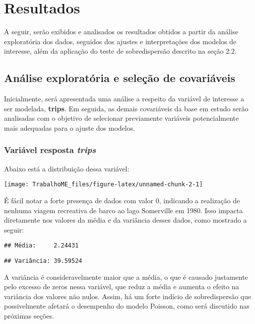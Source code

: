\documentclass[
  twocolumn]{article}
\begin{document}
\section{Resultados}\label{resultados}

A seguir, serão exibidos e analisados os resultados obtidos a partir da
análise exploratória dos dados, seguidos dos ajustes e interpretações
dos modelos de interesse, além da aplicação do teste de sobredispersão
descrito na seção 2.2.

\subsection{Análise exploratória e seleção de
covariáveis}\label{anuxe1lise-exploratuxf3ria-e-seleuxe7uxe3o-de-covariuxe1veis}

Inicialmente, será apresentada uma análise a respeito da variável de
interesse a ser modelada, \textbf{trips}. Em seguida, as demais
covariáveis da base em estudo serão analisadas com o objetivo de
selecionar previamente variáveis potencialmente mais adequadas para o
ajuste dos modelos.

\subsubsection{\texorpdfstring{Variável resposta
\emph{trips}}{Variável resposta trips}}\label{variuxe1vel-resposta-trips}

Abaixo está a distribuição dessa variável:

\begin{center}\texttt{[image: TrabalhoME\_files/figure-latex/unnamed-chunk-2-1]} \end{center}

É fácil notar a forte presença de dados com valor \(0\), indicando a
realização de nenhuma viagem recreativa de barco ao lago Somerville em
1980. Isso impacta diretamente nos valores da média e da variância
desses dados, como mostrado a seguir:

\begin{verbatim}
## Média:     2.24431
\end{verbatim}

\begin{verbatim}
## Variância: 39.59524
\end{verbatim}

A variância é consideravelmente maior que a média, o que é causado
justamente pelo excesso de zeros nessa variável, que reduz a média e
aumenta o efeito na variância dos valores não nulos. Assim, há um forte
indício de sobredispersão que possivelmente afetará o desempenho do
modelo Poisson, como será discutido nas próximas seções.
\end{document}
